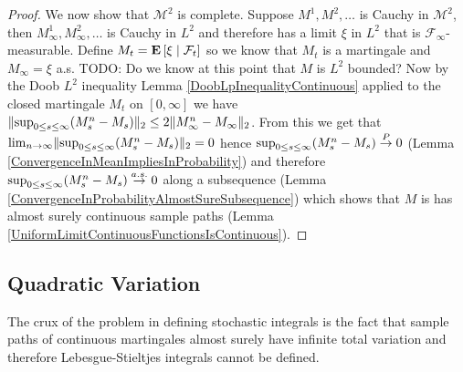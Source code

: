 \begin{proof}
We now show that $\mathcal{M}^2$ is complete.  Suppose $M^1, M^2, \dotsc$ is Cauchy in $\mathcal{M}^2$, then $M^1_\infty, M^2_\infty, \dotsc$ is Cauchy in $L^2$ and therefore has a limit $\xi$ in $L^2$ that is $\mathcal{F}_\infty$-measurable.  Define $M_t = \textbf{E}\left[ \xi \mid \mathcal{F}_t \right]$ so we know that $M_t$ is a martingale and $M_\infty = \xi$ a.s.  TODO: Do we know at this point that $M$ is $L^2$ bounded?  Now by the Doob $L^2$ inequality Lemma \ref{DoobLpInequalityContinuous} applied to the closed martingale $M_t$ on $[0,\infty]$ we have $\lVert \sup_{0 \leq s \leq \infty} (M_s^n - M_s) \rVert_2 \leq 2 \lVert M^n_\infty - M_\infty \rVert_2$.  From this we get that $\lim_{n \to \infty} \lVert \sup_{0 \leq s \leq \infty} (M_s^n - M_s) \rVert_2 = 0$ hence $\sup_{0 \leq s \leq \infty} (M_s^n - M_s) \overset{P}\to 0$ (Lemma \ref{ConvergenceInMeanImpliesInProbability}) and therefore $\sup_{0 \leq s \leq \infty} (M_s^n - M_s) \overset{a.s.}\to 0$ along a subsequence (Lemma \ref{ConvergenceInProbabilityAlmostSureSubsequence}) which shows that $M$ is has almost surely continuous sample paths (Lemma \ref{UniformLimitContinuousFunctionsIsContinuous}).
\end{proof}

\subsection{Quadratic Variation}
The crux of the problem in defining stochastic integrals is the fact that sample paths of continuous martingales almost surely have infinite total variation and therefore Lebesgue-Stieltjes integrals cannot be defined.   

